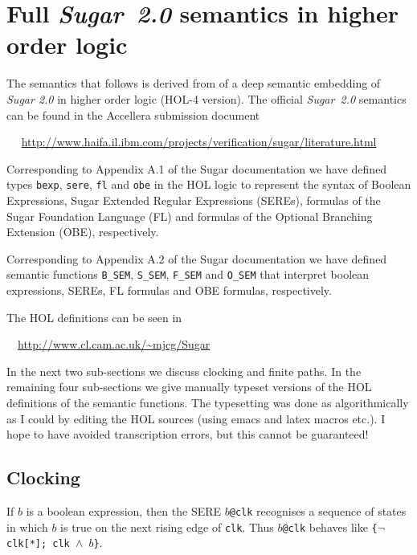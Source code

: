 \documentclass{llncs}
\newcommand\Sugar{{\it{Sugar~2.0}}\xspace}
\begin{document}
\section{Full \Sugar semantics in higher order logic}\label{SugarSemantics}

The semantics that follows is derived from of a deep semantic embedding of
{\it Sugar 2.0} in higher order logic (HOL-4 version).
The official  \Sugar semantics can be found in the Accellera submission document

\medskip

~~{
\url{http://www.haifa.il.ibm.com/projects/verification/sugar/literature.html}}

\medskip

Corresponding to Appendix A.1 of the Sugar documentation
we have defined types \texttt{bexp}, \texttt{sere}, \texttt{fl} and
\texttt{obe} in the HOL logic to represent the syntax of Boolean Expressions, Sugar
Extended Regular Expressions (SEREs), formulas of the Sugar Foundation
Language (FL) and formulas of the Optional Branching Extension (OBE),
respectively.


Corresponding to Appendix A.2 of the Sugar documentation
we have defined semantic functions \texttt{B\_SEM}, \texttt{S\_SEM},
\texttt{F\_SEM} and \texttt{O\_SEM} that interpret boolean expressions,
SEREs, FL formulas and OBE formulas, respectively.

The HOL definitions can be seen in

\medskip

~~{\url{http://www.cl.cam.ac.uk/~mjcg/Sugar}}

\medskip

In the next two sub-sections we discuss clocking and finite paths.
In the remaining four sub-sections 
we give manually
typeset versions of the HOL definitions of the semantic functions. The
typesetting was done as algorithmically as I could by editing the HOL
sources (using emacs and latex macros etc.). I hope to have avoided
transcription errors, but this cannot be guaranteed!

\subsection{Clocking}

If $b$ is a boolean expression, then the SERE \texttt{$b$@clk} recognises
a sequence of states in which $b$ is true on the next rising edge of \texttt{clk}.
Thus \texttt{$b$@clk} behaves like \texttt{\{$\neg$clk[*]; clk ${\wedge}$ $b$\}}.
\end{document}
